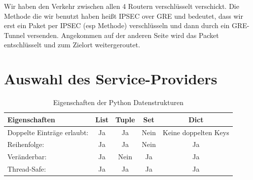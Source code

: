 \documentclass[fontsize=12pt,paper=a4,open=any,parskip=half,
  twoside=false,toc=listof,toc=bibliography,fleqn,leqno,
  captions=nooneline,captions=tableabove,british]{scrbook}
\begin{document}
\par
Wir haben den Verkehr zwischen allen 4 Routern verschlüsselt verschickt. Die Methode die wir benutzt haben heißt IPSEC over GRE und bedeutet, dass wir erst ein Paket per IPSEC (esp Methode) verschlüsseln und dann durch ein GRE-Tunnel versenden. Angekommen auf der anderen Seite wird das Packet entschlüsselt und zum Zielort weitergeroutet.

\section{Auswahl des Service-Providers}
\begin{table}[htbp]
\caption{Eigenschaften der Python Datenstrukturen \autocite{listuple}}
\label{python-data-table}
\centering
  \begin{tabular}{l  c  c  c c} 
\toprule
    Eigenschaften & List & Tuple & Set & Dict\\ 
\midrule  
    	Doppelte Einträge erlaubt:   			& Ja  	&  Ja  		& Nein 	& Keine doppelten Keys\\
    	Reihenfolge:   						& Ja 	&  Ja 		& Nein 	& Ja\\ 
	Veränderbar:   						& Ja	&  Nein 	& Ja 		& Ja\\ 
	Thread-Safe:   						& Ja 	& Ja 	& Ja 		& Ja\\ 
  \end{tabular}

\end{table}
\end{document}

